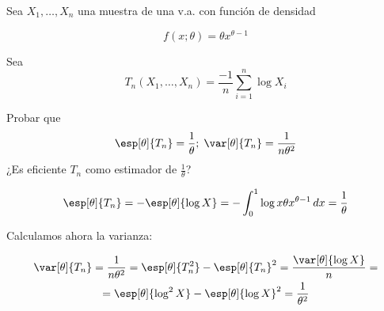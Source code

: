 \begin{problem}[9] Sea $X_1,\dotsc,X_n$ una muestra de una v.a. con función de densidad 

\[ f(x;\theta) = \theta x^{\theta - 1} \]

Sea  \[ T_n(X_1,\dotsc,X_n) = \frac{-1}{n}\sum_{i=1}^n\log X_i \]

\ppart Probar que \[\esp[\theta]{T_n} = \frac{1}{\theta};\; \var[\theta]{T_n} = \frac{1}{n\theta^2} \]
\ppart ¿Es eficiente $T_n$ como estimador de $\frac{1}{\theta}$?

\solution

\spart

\[ \esp[\theta]{T_n} = -\esp[\theta]{\log X} = - \int_0^1 \log x \theta x ^{\theta-1}\,dx = \frac{1}{\theta} \]

Calculamos ahora la varianza:

\begin{gather*}
\var[\theta]{T_n} = \frac{1}{n\theta^2} = \esp[\theta]{T_n^2} - \esp[\theta]{T_n}^2 = \frac{\var[\theta]{\log X}}{n} = \\
= \esp[\theta]{\log^2 X} - \esp[\theta]{\log X}^2 = \frac{1}{\theta^2}
\end{gather*}

\end{problem}
